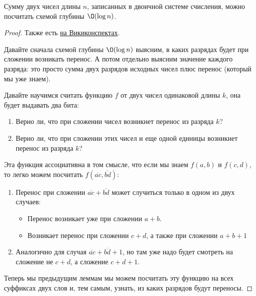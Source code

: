	\begin{theorem}
		Сумму двух чисел длины $n$, записанных в двоичной системе счисления, можно посчитать схемой глубины $\O(\log n)$.
	\end{theorem}
	\begin{proof}
		Также есть \href{http://neerc.ifmo.ru/wiki/index.php?title=\%D0\%94\%D0\%B2\%D0\%BE\%D0\%B8\%D1\%87\%D0\%BD\%D1\%8B\%D0\%B9_\%D0\%BA\%D0\%B0\%D1\%81\%D0\%BA\%D0\%B0\%D0\%B4\%D0\%BD\%D1\%8B\%D0\%B9_\%D1\%81\%D1\%83\%D0\%BC\%D0\%BC\%D0\%B0\%D1\%82\%D0\%BE\%D1\%80}{на Викиконспектах}.

		Давайте сначала схемой глубины $\O(\log n)$ выясним, в каких разрядах будет при сложении возникать перенос.
		А потом отдельно выясним значение каждого разряда: это просто сумма двух разрядов исходных чисел плюс перенос (который мы уже знаем).

		Давайте научимся считать функцию $f$ от двух чисел одинаковой длины $k$, она будет выдавать два бита:
		\begin{enumerate}
			\item Верно ли, что при сложении чисел возникнет перенос из разряда $k$?
			\item Верно ли, что при сложении этих чисел и еще одной единицы возникнет перенос из разряда $k$?
		\end{enumerate}
		Эта функция ассоциативна в том смысле, что если мы знаем $f(a, b)$ и $f(c, d)$, то легко можем посчитать $f(\overline{ac}, \overline{bd})$:
		\begin{enumerate}
			\item
				Перенос при сложении $\overline{ac} + \overline{bd}$ может случиться только в одном из двух случаев:
				\begin{itemize}
					\item Перенос возникает уже при сложении $a+b$.
					\item Возникает перенос при сложении $c+d$, а также при сложении $a+b+1$
				\end{itemize}
			\item
				Аналогично для случая $\overline{ac}+\overline{bd}+1$, но там уже надо будет смотреть на сложение не $c+d$, а сложение $c+d+1$.
		\end{enumerate}
		Теперь мы предыдущим леммам мы можем посчитать эту функцию на всех суффиксах двух слов и, тем самым, узнать, из каких разрядов будут переносы.
	\end{proof}

